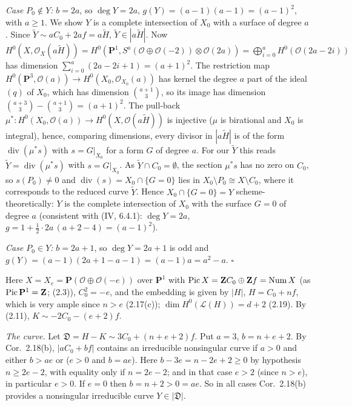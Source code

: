 \documentclass[11pt]{article}
\begin{document}
\emph{Case $P_0\notin Y$:} $b=2a$, so $\deg Y=2a$, $g(Y)=(a-1)(a-1)=(a-1)^2$, with $a\ge1$. We show $Y$ is a complete intersection of $X_0$ with a surface of degree $a$. Since $\tilde Y\sim aC_0+2af=a\tilde H$, $\tilde Y\in|a\tilde H|$. Now $H^0(X,\mathcal O_X(a\tilde H))=H^0(\mathbf P^1,S^a(\mathcal O\oplus\mathcal O(-2))\otimes\mathcal O(2a))=\bigoplus_{i=0}^aH^0(\mathcal O(2a-2i))$ has dimension $\sum_{i=0}^a(2a-2i+1)=(a+1)^2$. The restriction map $H^0(\mathbf P^3,\mathcal O(a))\to H^0(X_0,\mathcal O_{X_0}(a))$ has kernel the degree $a$ part of the ideal $(q)$ of $X_0$, which has dimension $\binom{a+1}{3}$, so its image has dimension $\binom{a+3}3-\binom{a+1}3=(a+1)^2$. The pull-back $\mu^*\colon H^0(X_0,\mathcal O(a))\to H^0(X,\mathcal O(a\tilde H))$ is injective ($\mu$ is birational and $X_0$ is integral), hence, comparing dimensions, every divisor in $|a\tilde H|$ is of the form $\operatorname{div}(\mu^*s)$ with $s=G|_{X_0}$ for a form $G$ of degree $a$. For our $\tilde Y$ this reads $\tilde Y=\operatorname{div}(\mu^*s)$ with $s=G|_{X_0}$. As $\tilde Y\cap C_0=\emptyset$, the section $\mu^*s$ has no zero on $C_0$, so $s(P_0)\ne0$ and $\operatorname{div}(s)=X_0\cap\{G=0\}$ lies in $X_0\setminus P_0\cong X\setminus C_0$, where it corresponds to the reduced curve $\tilde Y$. Hence $X_0\cap\{G=0\}=Y$ scheme-theoretically: $Y$ is the complete intersection of $X_0$ with the surface $G=0$ of degree $a$ (consistent with (IV, 6.4.1): $\deg Y=2a$, $g=1+\frac12\cdot2a\,(a+2-4)=(a-1)^2$).

\emph{Case $P_0\in Y$:} $b=2a+1$, so $\deg Y=2a+1$ is odd and $g(Y)=(a-1)(2a+1-a-1)=(a-1)a=a^2-a$. \hfill$\square$

\pf
Here $X=X_e=\mathbf P(\mathcal O\oplus\mathcal O(-e))$ over $\mathbf P^1$ with $\operatorname{Pic}X=\mathbf Z C_0\oplus\mathbf Z f=\operatorname{Num}X$ (as $\operatorname{Pic}\mathbf P^1=\mathbf Z$; (2.3)), $C_0^2=-e$, and the embedding is given by $|H|$, $H=C_0+nf$, which is very ample since $n>e$ (2.17(c)); $\dim H^0(\mathcal L(H))=d+2$ (2.19). By (2.11), $K\sim-2C_0-(e+2)f$.

\emph{The curve.} Let $\mathfrak D=H-K\sim3C_0+(n+e+2)f$. Put $a=3$, $b=n+e+2$. By Cor.~2.18(b), $|aC_0+bf|$ contains an irreducible nonsingular curve if $a>0$ and either $b>ae$ or ($e>0$ and $b=ae$). Here $b-3e=n-2e+2\ge0$ by hypothesis $n\ge2e-2$, with equality only if $n=2e-2$; and in that case $e>2$ (since $n>e$), in particular $e>0$. If $e=0$ then $b=n+2>0=ae$. So in all cases Cor.~2.18(b) provides a nonsingular irreducible curve $Y\in|\mathfrak D|$.
\end{document}

